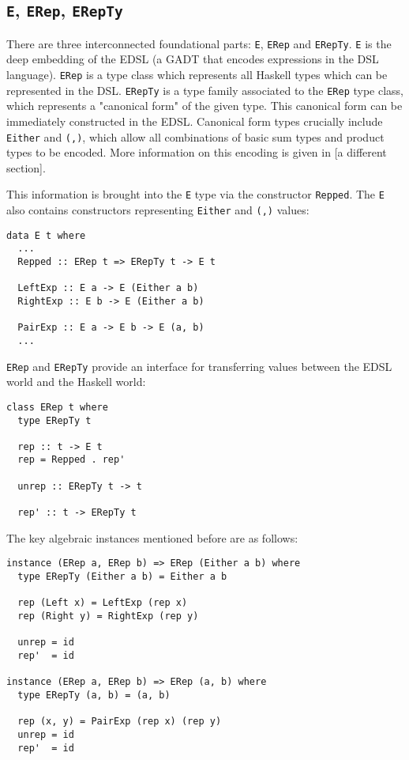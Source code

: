 \documentclass[acmsmall]{acmart}
\newcommand{\ttt}{\texttt}
\begin{document}
\subsection{\ttt{E}, \ttt{ERep}, \ttt{ERepTy}}

There are three interconnected foundational parts: \ttt{E}, \ttt{ERep} and
\ttt{ERepTy}. \ttt{E} is the deep embedding of the EDSL (a GADT that encodes
expressions in the DSL language). \ttt{ERep} is a type class which represents
all Haskell types which can be represented in the DSL. \ttt{ERepTy} is a type
family associated to the \ttt{ERep} type class, which represents a "canonical form"
of the given type. This canonical form can be immediately constructed in the EDSL.
Canonical form types crucially include \ttt{Either} and \ttt{(,)}, which
allow all combinations of basic sum types and product types to be encoded. More
information on this encoding is given in [a different section].

This information is brought into the \ttt{E} type via the constructor
\ttt{Repped}. The \ttt{E} also contains constructors representing \ttt{Either}
and \ttt{(,)} values:

\begin{lstlisting}
data E t where
  ...
  Repped :: ERep t => ERepTy t -> E t

  LeftExp :: E a -> E (Either a b)
  RightExp :: E b -> E (Either a b)

  PairExp :: E a -> E b -> E (a, b)
  ...
\end{lstlisting}

\ttt{ERep} and \ttt{ERepTy} provide an interface for transferring values between the EDSL
world and the Haskell world:

\begin{lstlisting}
class ERep t where
  type ERepTy t

  rep :: t -> E t
  rep = Repped . rep'

  unrep :: ERepTy t -> t

  rep' :: t -> ERepTy t
\end{lstlisting}

The key algebraic instances mentioned before are as follows:

\begin{lstlisting}
instance (ERep a, ERep b) => ERep (Either a b) where
  type ERepTy (Either a b) = Either a b

  rep (Left x) = LeftExp (rep x)
  rep (Right y) = RightExp (rep y)

  unrep = id
  rep'  = id

instance (ERep a, ERep b) => ERep (a, b) where
  type ERepTy (a, b) = (a, b)

  rep (x, y) = PairExp (rep x) (rep y)
  unrep = id
  rep'  = id
\end{lstlisting}
\end{document}
